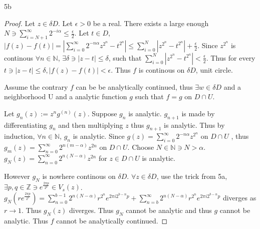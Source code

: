 \documentclass{article}
\newcommand{\Z}{\mathbb{Z}}
\newcommand{\N}{\mathbb{N}}
\begin{document}
\begin{PROB}{5b}\label{Problem 5b.}
\end{PROB}
\begin{proof}
    Let $z \in \delta D$. Let $\epsilon > 0$ be a real. There exists a large enough $N \ni \sum_{i = N+ 1}^{\infty} 2^{-i\alpha} \leq \frac{\epsilon}{2}$. Let $t \in D$, $|f(z) - f(t)| = |\sum_{i = 0}^{\infty} 2^{{-n \alpha}}z^{2^n} - t^{2^n}| \leq \sum_{i = 0}^{N} |z^{2^n} - t^{2^n}| + \frac{\epsilon}{2}$. Since $z^{2^n}$ is continous $\forall n \in \N$, $\exists \delta \ni |z - t| \leq \delta$, such that $\sum_{i = 0}^{N} |z^{2^n} - t^{2^n}| < \frac{\epsilon}{2}$. Thus for every $t \ni |z - t| \leq \delta, |f(z) - f(t)| < \epsilon$. Thus $f$ is continous on $\delta D$, unit circle. 
    
    Assume the contrary $f$ can be be analytically continued, thus $\exists w \in \delta D$ and a neighborhood U and a analytic function $g$  such that $f = g$ on $D \cap U$. 
    
    Let $g_n(z) := z^n g^{(n)}(z)$. Suppose $g_n$ is analytic. $g_{n + 1}$ is made by differentiating $g_n$ and then multiplying $z$ thus $g_{n + 1}$ is analytic. Thus by induction, $\forall n \in \N$, $g_n$ is analytic. Since $g(z) = \sum_{i = 0}^{\infty} 2^{{-n \alpha}}z^{2^n}$ on $D \cap U$ , thus $g_m(z) = \sum_{n =0}^{\infty} 2^{n(m - \alpha)} z^{2n}$ on $D \cap U$. Choose $N \in \N \ni N > \alpha$. $g_N(z) = \sum_{n =0}^{\infty} 2^{n(N - \alpha)} z^{2n}$ for $z \in D \cap U$ is analytic.
    
    However $g_N$ is nowhere continous on $\delta D$. $\forall z \in \delta D$, use the trick from 5a, $\exists p, q \in \Z \ni e^{\frac{2 \pi p}{2^q}} \in V_{s}(z)$. $g_N(re^{\frac{2 \pi p}{2^q}}) = \sum_{n = 0}^{b - 1}2^{n(N - \alpha)} r^{2^n} e^{2 \pi i 2^{b - n} p} + \sum_{n = b}^{\infty}2^{n(N - \alpha)} r^{2^n} e^{2 \pi i 2^{b - n} p}$ diverges as $r \to 1$. Thus $g_N(z)$ diverges. Thus $g_N$ cannot be analytic and thus $g$ cannot be analytic. Thus $f$ cannot be analytically continued.       
\end{proof}
\end{document}
